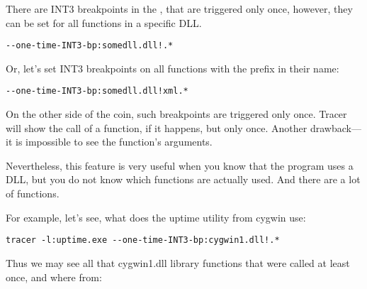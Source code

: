 There are INT3 breakpoints in the \tracer, that are triggered only once, however, they can be set for all functions
in a specific DLL.

\begin{lstlisting}
--one-time-INT3-bp:somedll.dll!.*
\end{lstlisting}

Or, let's set INT3 breakpoints on all functions with the  prefix in their name:

\begin{lstlisting}
--one-time-INT3-bp:somedll.dll!xml.*
\end{lstlisting}

On the other side of the coin, such breakpoints are triggered only once.
Tracer will show the call of a function, if it happens, but only once.
Another drawback---it is impossible to see the function's arguments.

Nevertheless, this feature is very useful when you know that the program uses a DLL,
but you do not know which functions are actually used.
And there are a lot of functions. 

\par
{}
For example, let's see, what does the uptime utility from cygwin use:

\begin{lstlisting}
tracer -l:uptime.exe --one-time-INT3-bp:cygwin1.dll!.*
\end{lstlisting}

Thus we may see all that cygwin1.dll library functions that were called at least once, and where from:



